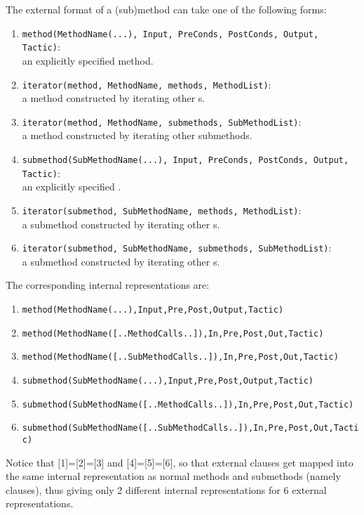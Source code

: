 The external format of a (sub)method can take one of the following
forms:
\begin{enumerate}
\item
{\tt method(MethodName(...), Input, PreConds, PostConds, Output, Tactic)}:\\
an explicitly specified method. 
\item
{\tt iterator(method, MethodName, methods, MethodList)}:\\
a method constructed by iterating other s.
\item
{\tt iterator(method, MethodName, submethods, SubMethodList)}:\\
a method constructed by iterating other submethods.
\item
{\tt submethod(SubMethodName(...), Input, PreConds, PostConds, Output, Tactic)}:\\
an explicitly specified .
\item
{\tt iterator(submethod, SubMethodName, methods, MethodList)}:\\
a submethod constructed by iterating other s.
\item
{\tt iterator(submethod, SubMethodName, submethods, SubMethodList)}:\\
a submethod constructed by iterating other s.
\end{enumerate}

The corresponding internal representations are:
\begin{enumerate}
\item
{\tt method(MethodName(...),Input,Pre,Post,Output,Tactic)}
\item
{\tt method(MethodName([..MethodCalls..]),In,Pre,Post,Out,Tactic)}
\item
{\tt method(MethodName([..SubMethodCalls..]),In,Pre,Post,Out,Tactic)}
\item
{\tt submethod(SubMethodName(...),Input,Pre,Post,Output,Tactic)}
\item
{\tt submethod(SubMethodName([..MethodCalls..]),In,Pre,Post,Out,Tactic)}
\item
{\tt submethod(SubMethodName([..SubMethodCalls..]),In,Pre,Post,Out,Tactic)}
\end{enumerate}

Notice that [1]=[2]=[3] and [4]=[5]=[6], so that external
 clauses get mapped into the same
internal representation as normal methods and submethods (namely
 clauses), thus giving only 2 different internal
representations for 6 external representations.

